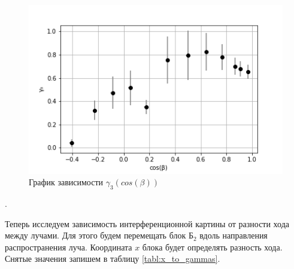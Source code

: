 \documentclass[a4paper, 12pt]{article}
\newcounter{Points}
\newcommand{\point}{\arabic{Points}. \addtocounter{Points}{1}}
\begin{document}
\begin{figure}
    \centering
    \includegraphics{gamma_from_cos_beta.png}
    \caption{График зависимости $\gamma_3(cos(\beta))$}
    \label{img:gamma_from_cos_beta}
\end{figure}

\point Теперь исследуем зависимость интерференционной картины от разности хода между лучами. Для этого будем перемещать блок $Б_2$ вдоль направления распространения луча. Координата $x$ блока будет определять разность хода. Снятые значения запишем в таблицу \ref{tabl:x_to_gammas}.
\end{document}
